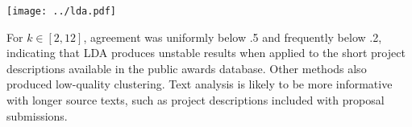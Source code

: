 \documentclass[a0paper, landscape]{baposter}
\begin{document}
\begin{poster}
{	\texttt{[image: ../lda.pdf]}
	
	For $k \in [2, 12]$, agreement was uniformly below .5 and frequently below .2, indicating that LDA produces unstable results when applied to the short project descriptions available in the public awards database.  Other methods also produced low-quality clustering.  Text analysis is likely to be more informative with longer source texts, such as project descriptions included with proposal submissions.  
}



\end{poster}
\end{document}
